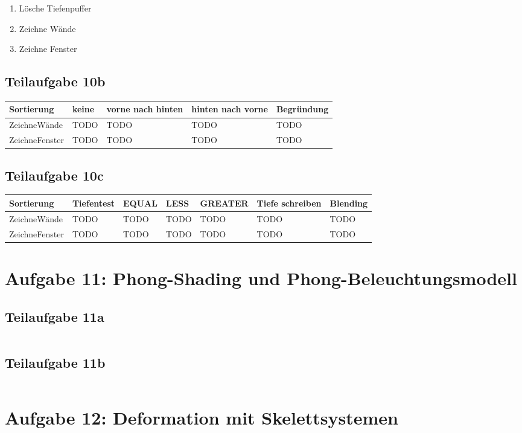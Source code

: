 \documentclass[a4paper]{scrartcl}
\begin{document}
\begin{enumerate}
    \item Lösche Tiefenpuffer
    \item Zeichne Wände
    \item Zeichne Fenster
\end{enumerate}

\subsection*{Teilaufgabe 10b}

\begin{table}[H]
    \begin{tabular}{lllll}
    \toprule
    Sortierung     & keine & vorne nach hinten & hinten nach vorne & Begründung \\\midrule
    ZeichneWände   & TODO  & TODO              & TODO              & TODO       \\
    ZeichneFenster & TODO  & TODO              & TODO              & TODO       \\\bottomrule
    \end{tabular}
\end{table}

\subsection*{Teilaufgabe 10c}
\begin{table}[H]
    \begin{tabular}{lllllll}\toprule
    Sortierung     & Tiefentest & EQUAL & LESS & GREATER & Tiefe schreiben & Blending \\\midrule
    ZeichneWände   & TODO       & TODO  & TODO & TODO    & TODO            & TODO    \\
    ZeichneFenster & TODO       & TODO  & TODO & TODO    & TODO            & TODO   \\\bottomrule
    \end{tabular}
\end{table}

\section*{Aufgabe 11: Phong-Shading und Phong-Beleuchtungsmodell}
\subsection*{Teilaufgabe 11a}
\inputminted[linenos, numbersep=5pt, tabsize=4, frame=lines, label=shader.vert]{glsl}{shader.vert}

\subsection*{Teilaufgabe 11b}
\inputminted[linenos, numbersep=5pt, tabsize=4, frame=lines, label=shader.frag]{glsl}{shader.frag}

\section*{Aufgabe 12: Deformation mit Skelettsystemen}
\inputminted[linenos, numbersep=5pt, tabsize=4, frame=lines, label=skelett.vert]{glsl}{skelett.vert}
\end{document}
